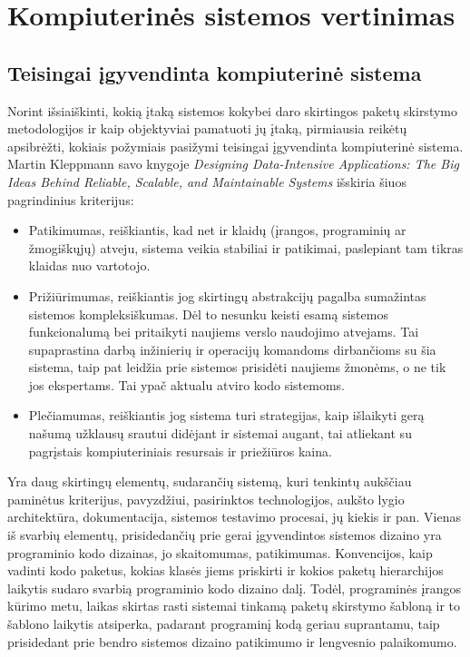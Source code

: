 \section{Kompiuterinės sistemos vertinimas}
\subsection{Teisingai įgyvendinta kompiuterinė sistema}
Norint išsiaiškinti, kokią įtaką sistemos kokybei daro skirtingos paketų skirstymo metodologijos ir kaip objektyviai pamatuoti jų įtaką, pirmiausia
reikėtų apsibrėžti, kokiais požymiais pasižymi teisingai įgyvendinta kompiuterinė sistema.
Martin Kleppmann savo knygoje \textit{Designing Data-Intensive Applications: The Big Ideas Behind Reliable, Scalable, and Maintainable Systems} išskiria šiuos pagrindinius kriterijus:
\begin{itemize}
    \item Patikimumas, reiškiantis, kad net ir klaidų (įrangos, programinių ar žmogiškųjų) atveju,
    sistema veikia stabiliai ir patikimai, paslepiant tam tikras klaidas nuo vartotojo\cite{DataIntensiveApplications}.
    \item Prižiūrimumas, reiškiantis jog skirtingų abstrakcijų pagalba sumažintas sistemos kompleksiškumas.
    Dėl to nesunku keisti esamą sistemos funkcionalumą bei pritaikyti naujiems verslo naudojimo atvejams.
    Tai supaprastina darbą inžinierių ir operacijų komandoms dirbančioms su šia sistema, taip pat leidžia prie sistemos prisidėti naujiems žmonėms, o ne
    tik jos ekspertams.
    Tai ypač aktualu atviro kodo sistemoms\cite{DataIntensiveApplications}.
    \item Plečiamumas, reiškiantis jog sistema turi strategijas, kaip išlaikyti gerą našumą užklausų
    srautui didėjant ir sistemai augant, tai atliekant su pagrįstais kompiuteriniais resursais ir
    priežiūros kaina\cite{DataIntensiveApplications}.
\end{itemize}
Yra daug skirtingų elementų, sudarančių sistemą, kuri tenkintų aukščiau paminėtus kriterijus,
pavyzdžiui, pasirinktos technologijos, aukšto lygio architektūra, dokumentacija, sistemos testavimo
procesai, jų kiekis ir pan.
Vienas iš svarbių elementų, prisidedančių prie gerai įgyvendintos sistemos dizaino yra programinio kodo dizainas, jo skaitomumas, patikimumas.
Konvencijos, kaip vadinti kodo paketus, kokias klasės jiems priskirti ir kokios paketų hierarchijos laikytis sudaro svarbią programinio kodo dizaino dalį.
Todėl, programinės įrangos kūrimo metu, laikas skirtas rasti sistemai tinkamą paketų skirstymo šabloną ir to šablono laikytis atsiperka, padarant
programinį kodą geriau suprantamu, taip prisidedant prie bendro sistemos dizaino patikimumo ir lengvesnio palaikomumo.

